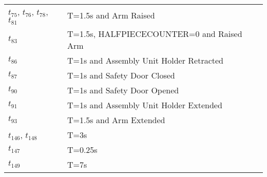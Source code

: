 \begin{longtable}{M{5cm}M{10cm}}
\hyperlink{completeNet:tt75}{\hypertarget{completeTable:tt75}{$t_{75}$}}, \hyperlink{completeNet:tt76}{\hypertarget{completeTable:tt76}{$t_{76}$}}, \hyperlink{completeNet:tt78}{\hypertarget{completeTable:tt78}{$t_{78}$}}, \hyperlink{completeNet:tt81}{\hypertarget{completeTable:tt81}{$t_{81}$}} & T=1.5s and Arm Raised\\
\hyperlink{completeNet:tt83}{\hypertarget{completeTable:tt83}{$t_{83}$}} & T=1.5s, HALFPIECECOUNTER=0 and Raised Arm\\
\hyperlink{completeNet:tt86}{\hypertarget{completeTable:tt86}{$t_{86}$}} & T=1s and Assembly Unit Holder Retracted\\
\hyperlink{completeNet:tt87}{\hypertarget{completeTable:tt87}{$t_{87}$}} & T=1s and Safety Door Closed\\
\hyperlink{completeNet:tt90}{\hypertarget{completeTable:tt90}{$t_{90}$}} & T=1s and Safety Door Opened\\
\hyperlink{completeNet:tt91}{\hypertarget{completeTable:tt91}{$t_{91}$}} & T=1s and Assembly Unit Holder Extended\\
\hyperlink{completeNet:tt93}{\hypertarget{completeTable:tt93}{$t_{93}$}} & T=1.5s and Arm Extended\\
\hyperlink{completeNet:tt146}{\hypertarget{completeTable:tt146}{$t_{146}$}}, \hyperlink{completeNet:tt148}{\hypertarget{completeTable:tt148}{$t_{148}$}} & T=3s\\
\hyperlink{completeNet:tt147}{\hypertarget{completeTable:tt147}{$t_{147}$}} & T=0.25s\\
\hyperlink{completeNet:tt149}{\hypertarget{completeTable:tt149}{$t_{149}$}} & T=7s\\
\end{longtable}
